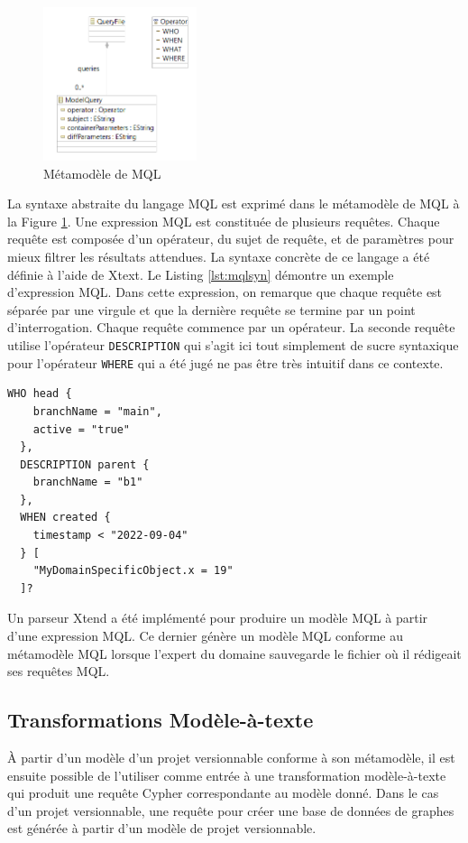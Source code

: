 \documentclass[12pt, titlepage]{article}
\begin{document}
\begin{figure}[ht!]
  \centering
  \includegraphics[width=0.4\textwidth]{mqlmm.png}
  \caption{Métamodèle de MQL}
  \label{fig:mqlmm}
\end{figure}

La syntaxe abstraite du langage MQL est exprimé dans le métamodèle de MQL à la
Figure \ref{fig:mqlmm}. Une expression MQL est constituée de plusieurs requêtes.
Chaque requête est composée d'un opérateur, du sujet de requête, et de
paramètres pour mieux filtrer les résultats attendues. La syntaxe concrète de ce
langage a été définie à l'aide de Xtext. Le Listing \ref{lst:mqlsyn} démontre un
exemple d'expression MQL. Dans cette expression, on remarque que chaque requête
est séparée par une virgule et que la dernière requête se termine par un point
d'interrogation. Chaque requête commence par un opérateur. La seconde requête
utilise l'opérateur \texttt{DESCRIPTION} qui s'agit ici tout simplement de sucre
syntaxique pour l'opérateur \texttt{WHERE} qui a été jugé ne pas être très
intuitif dans ce contexte.

\begin{lstlisting}[style=mql, label=lst:mqlsyn, caption=Expression MQL]
  WHO head {
    branchName = "main",
    active = "true"
  },
  DESCRIPTION parent {
    branchName = "b1"
  },
  WHEN created {
    timestamp < "2022-09-04"
  } [
    "MyDomainSpecificObject.x = 19"
  ]?
\end{lstlisting}

Un parseur Xtend a été implémenté pour produire un modèle MQL à partir d'une
expression MQL. Ce dernier génère un modèle MQL conforme au métamodèle MQL
lorsque l'expert du domaine sauvegarde le fichier où il rédigeait ses requêtes
MQL.

\subsection*{Transformations Modèle-à-texte}

À partir d'un modèle d'un projet versionnable conforme à son métamodèle, il est
ensuite possible de l'utiliser comme entrée à une transformation modèle-à-texte
qui produit une requête Cypher correspondante au modèle donné. Dans le cas d'un
projet versionnable, une requête pour créer une base de données de graphes est
générée à partir d'un modèle de projet versionnable.
\end{document}
